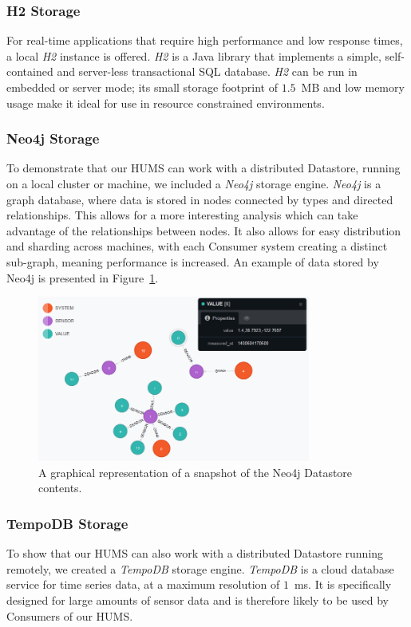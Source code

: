 \documentclass[10pt,a4paper]{article}
\begin{document}
\subsubsection{H2 Storage}
For real-time applications that require high performance and low response times, a local \emph{H2} instance is offered. \emph{H2} is a Java library that implements a simple, self-contained and server-less transactional SQL database. \emph{H2} can be run in embedded or server mode; its small storage footprint of $1.5$~MB and low memory usage make it ideal for use in resource constrained environments. 

\subsubsection{Neo4j Storage}
To demonstrate that our HUMS can work with a distributed Datastore, running on a local cluster or machine, we included a \emph{Neo4j} storage engine. \emph{Neo4j} is a graph database, where data is stored in nodes connected by types and directed relationships. This allows for a more interesting analysis which can take advantage of the relationships between nodes. It also allows for easy distribution and sharding across machines, with each Consumer system creating a distinct sub-graph, meaning performance is increased. An example of data stored by Neo4j is presented in Figure~\ref{fig:neo4j}.

\begin{figure}[ht]
\centering
\includegraphics*[width=0.8\textwidth]{images/neo4j.png}
\caption{A graphical representation of a snapshot of the Neo4j Datastore contents.}
\label{fig:neo4j}
\end{figure}

\subsubsection{TempoDB Storage}
To show that our HUMS can also work with a distributed Datastore running remotely, we created a \emph{TempoDB} storage engine. \emph{TempoDB} is a cloud database service for time series data, at a maximum resolution of $1$~ms. It is specifically designed for large amounts of sensor data and is therefore likely to be used by Consumers of our HUMS.  
\end{document}
